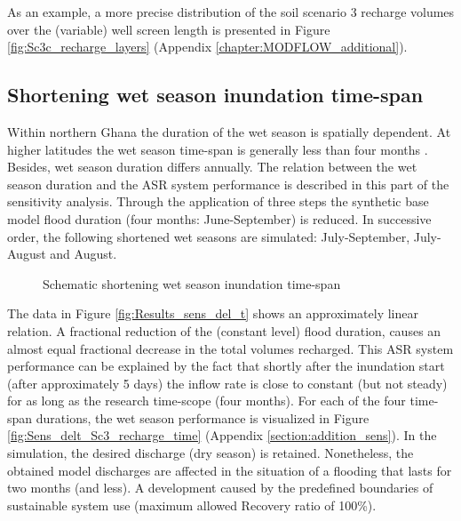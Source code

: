 As an example, a more precise distribution of the soil scenario 3 recharge volumes over the (variable) well screen length is presented in Figure \ref{fig:Sc3c_recharge_layers} (Appendix \ref{chapter:MODFLOW_additional}). 

\subsection{Shortening wet season inundation time-span}
\label{subsec:Sens_del_t}
Within northern Ghana the duration of the wet season is spatially dependent. At higher latitudes the wet season time-span is generally less than four months \citep{HAP2011}. Besides, wet season duration differs annually. The relation between the wet season duration and the ASR system performance is described in this part of the sensitivity analysis. Through the application of three steps the synthetic base model flood duration (four months: June-September) is reduced. In successive order, the following shortened wet seasons are simulated: July-September, July-August and August.  
   
\begin{figure}[H]
\centering
{}
\captionsetup{justification=centering}
\caption{Schematic shortening wet season inundation time-span}
\label{fig:Schematic_sens_del_t}
\end{figure}

The data in Figure \ref{fig:Results_sens_del_t} shows an approximately linear relation. A fractional reduction of the (constant level) flood duration, causes an almost equal fractional decrease in the total volumes recharged. This ASR system performance can be explained by the fact that shortly after the inundation start (after approximately 5 days) the inflow rate is close to constant (but not steady) for as long as the research time-scope (four months). For each of the four time-span durations, the wet season performance is visualized in Figure \ref{fig:Sens_delt_Sc3_recharge_time} (Appendix \ref{section:addition_sens}). In the simulation, the desired discharge (dry season) is retained. Nonetheless, the obtained model discharges are affected in the situation of a flooding that lasts for two months (and less). A development caused by the predefined boundaries of sustainable system use (maximum allowed Recovery ratio of 100\%). 
 
